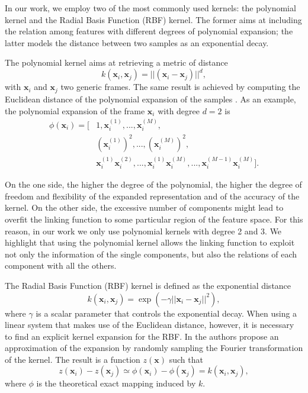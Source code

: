 In our work, we employ two of the most commonly used kernels: the polynomial kernel and the Radial Basis Function (RBF) kernel. The former aims at including the relation among features with different degrees of polynomial expansion; the latter models the distance between two samples as an exponential decay. 

The polynomial kernel aims at retrieving a metric of distance 
\begin{equation}
k(\mathbf{x}_i,\mathbf{x}_j)=||(\mathbf{x}_i-\mathbf{x}_j)||^d,
\end{equation} 
with $\mathbf{x}_i$ and $\mathbf{x}_j$ two generic frames. The same result is achieved by computing the Euclidean distance of the polynomial expansion of the samples \cite{Smola2004}. As an example, the polynomial expansion of the frame $\mathbf{x}_i$ with degree $d=2$ is 
\begin{equation}
\begin{split}
\phi(\mathbf{x}_i) = [& 1, \mathbf{x}_i^{(1)},...,\mathbf{x}_i^{(M)}, \\
 & \left(\mathbf{x}_i^{(1)}\right)^2, ...,  \left(\mathbf{x}_i^{(M)}\right)^2, \\
 & \mathbf{x}_i^{(1)} \mathbf{x}_i^{(2)}, ..., \mathbf{x}_i^{(1)} \mathbf{x}_i^{(M)}, ..., \mathbf{x}_i^{(M-1)} \mathbf{x}_i^{(M)}]. 
\end{split}
\end{equation}

On the one side, the higher the degree of the polynomial, the higher the degree of freedom and flexibility of the expanded representation and of the accuracy of the kernel. On the other side, the excessive number of components might lead to overfit the linking function to some particular region of the feature space. For this reason, in our work we only use polynomial kernels with degree 2 and 3. We highlight that using the polynomial kernel allows the linking function to exploit not only the information of the single components, but also the relations of each component with all the others.

The Radial Basis Function (RBF) kernel \cite{Smola2004} is defined as the exponential distance 
\begin{equation}
k(\mathbf{x}_i,\mathbf{x}_j)=\exp(-\gamma||\mathbf{x}_i-\mathbf{x}_j||^2),
\end{equation}
where $\gamma$ is a scalar parameter that controls the exponential decay. When using a linear system that makes use of the Euclidean distance, however, it is necessary to find an explicit kernel expansion for the RBF. In \cite{rahimi2009weighted}  the authors propose an approximation of the expansion by randomly sampling the Fourier transformation of the kernel. The result is a function $z(\mathbf{x})$ such that 
\begin{equation}
z(\mathbf{x}_i)-z(\mathbf{x}_j)\simeq \phi(\mathbf{x}_i)-\phi(\mathbf{x}_j) = k(\mathbf{x}_i,\mathbf{x}_j),
\end{equation}
where $\phi$ is the theoretical exact mapping induced by $k$.

